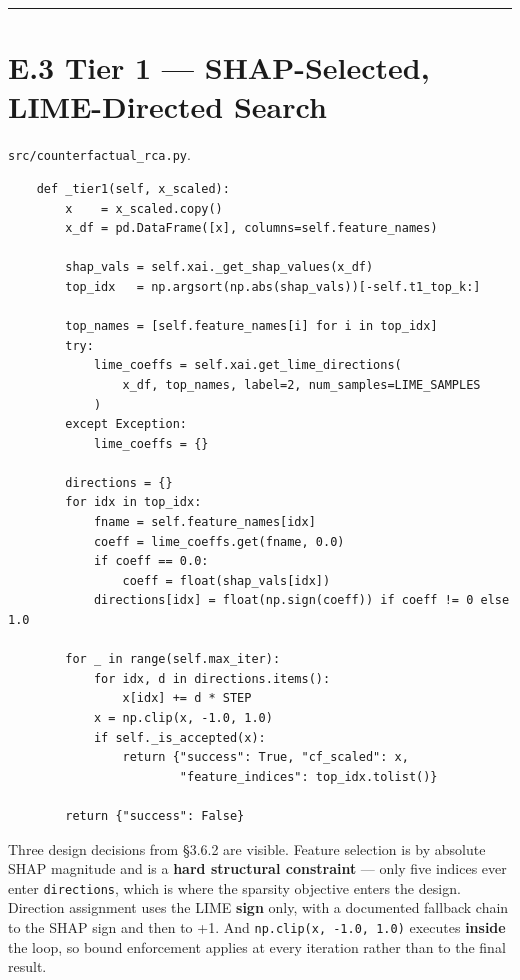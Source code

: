 \begin{center}\rule{0.5\linewidth}{0.5pt}\end{center}

\hypertarget{e.3-tier-1-shap-selected-lime-directed-search}{%
\section{E.3 Tier 1 --- SHAP-Selected, LIME-Directed Search}\label{e.3-tier-1-shap-selected-lime-directed-search}}

\texttt{src/counterfactual\_rca.py}.

\begin{verbatim}
    def _tier1(self, x_scaled):
        x    = x_scaled.copy()
        x_df = pd.DataFrame([x], columns=self.feature_names)

        shap_vals = self.xai._get_shap_values(x_df)
        top_idx   = np.argsort(np.abs(shap_vals))[-self.t1_top_k:]

        top_names = [self.feature_names[i] for i in top_idx]
        try:
            lime_coeffs = self.xai.get_lime_directions(
                x_df, top_names, label=2, num_samples=LIME_SAMPLES
            )
        except Exception:
            lime_coeffs = {}

        directions = {}
        for idx in top_idx:
            fname = self.feature_names[idx]
            coeff = lime_coeffs.get(fname, 0.0)
            if coeff == 0.0:
                coeff = float(shap_vals[idx])
            directions[idx] = float(np.sign(coeff)) if coeff != 0 else 1.0

        for _ in range(self.max_iter):
            for idx, d in directions.items():
                x[idx] += d * STEP
            x = np.clip(x, -1.0, 1.0)
            if self._is_accepted(x):
                return {"success": True, "cf_scaled": x,
                        "feature_indices": top_idx.tolist()}

        return {"success": False}
\end{verbatim}

Three design decisions from §3.6.2 are visible. Feature selection is by absolute SHAP magnitude and is a \textbf{hard structural constraint} --- only five indices ever enter \texttt{directions}, which is where the sparsity objective enters the design. Direction assignment uses the LIME \textbf{sign} only, with a documented fallback chain to the SHAP sign and then to +1. And \texttt{np.clip(x,\ -1.0,\ 1.0)} executes \textbf{inside} the loop, so bound enforcement applies at every iteration rather than to the final result.

